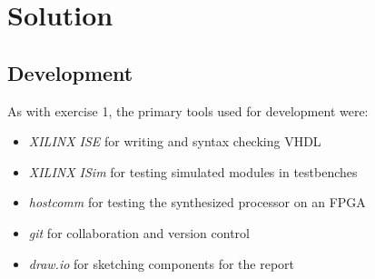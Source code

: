 \chapter{Solution}
\section{Development}
As with exercise 1, the primary tools used for development were:
\begin{itemize}
    \item   \textit{XILINX ISE} for writing and syntax checking VHDL
    \item   \textit{XILINX ISim} for testing simulated modules in testbenches
    \item   \textit{hostcomm}\cite{bib:hostcomm} for testing the synthesized processor on an FPGA
    \item   \textit{git} for collaboration and version control
    \item   \textit{draw.io} for sketching components for the report
\end{itemize}


\newpage


